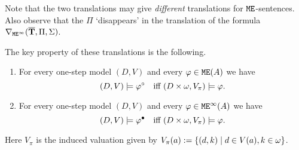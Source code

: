 Note that the two translations may give \emph{different} translations for 
$\mathtt{M}\mathtt{E}$-sentences.
Also observe that the $\Pi$ `disappears' in the translation of the formula
$\dbnfofoei{\vlist{T}}{\Pi}{\Sigma}$.

The key property of these translations is the following.

\begin{proposition}
\label{p-1P}
\begin{enumerate}
\item
For every one-step model $(D,V)$ and every $\varphi \in \mathtt{M}\mathtt{E}(A)$ we have
\begin{equation}
\label{eq-0cr}
(D,V) \models \phi^{\tmoda} \text{ iff } (D\times \omega,V_\pi) \models \phi.
\end{equation}
\item
For every one-step model $(D,V)$ and every $\varphi \in \mathtt{M}\mathtt{E}^{\infty}(A)$ we have
\begin{equation}
\label{eq-1cr}
(D,V) \models \phi^{\tmodb} \text{ iff } (D\times \omega,V_\pi) \models \phi.
\end{equation}
\end{enumerate}
\noindent
Here $V_{\pi}$ is the induced valuation given by 
$V_{\pi}(a) \mathrel{:=} \{ (d,k) \mid d \in V(a), k\in\omega\}$.
\end{proposition}

